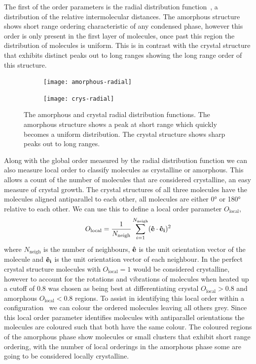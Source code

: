 The first of the order parameters is the radial distribution function~, a distribution of the relative intermolecular distances. The amorphous structure shows short range ordering characteristic of any condensed phase, however this order is only present in the first layer of molecules, once past this region the distribution of molecules is uniform. This is in contrast with the crystal structure that exhibits distinct peaks out to long ranges showing the long range order of this structure.

\begin{figure}
    \begin{subfigure}{0.5\textwidth}
        \texttt{[image: amorphous-radial]}
        \caption{}
        \label{fig:amorphous radial}
    \end{subfigure}
    \begin{subfigure}{0.5\textwidth}
        \texttt{[image: crys-radial]}
        \caption{}
        \label{fig:crys radial}
    \end{subfigure}
    \caption{The amorphous  and crystal  radial distribution functions. The amorphous structure shows a peak at short range which quickly becomes a uniform distribution. The crystal structure shows sharp peaks out to long ranges.}
    \label{fig:frame comp}
\end{figure}

Along with the global order measured by the radial distribution function we can also measure local order to classify molecules as crystalline or amorphous. This allows a count of the number of molecules that are considered crystalline, an easy measure of crystal growth. The crystal structures of all three molecules have the molecules aligned antiparallel to each other, all molecules are either \ang{0} or \ang{180} relative to each other. We can use this to define a local order parameter $O_\text{local}$,
\begin{equation}
    O_{\text{local}} = \frac{1}{N_{\text{neigh}}}\sum_{i=1}^{N_\text{neigh}} (\mathbf{\hat e} \cdot \mathbf{\hat e_i})^2
\end{equation}
where $N_\text{neigh}$ is the number of neighbours, $\mathbf{\hat e}$ is the unit orientation vector of the molecule and $\mathbf{\hat e_i}$ is the unit orientation vector of each neighbour. In the perfect crystal structure molecules with $O_\text{local}=1$ would be considered crystalline, however to account for the rotations and vibrations of molecules when heated up a cutoff of \num{0.8} was chosen as being best at differentiating crystal $O_\text{local}> 0.8$ and amorphous $O_\text{local} < 0.8$ regions. To assist in identifying this local order within a configuration~ we can colour the ordered molecules leaving all others grey. Since this local order parameter identifies molecules with antiparallel orientations the molecules are coloured such that both have the same colour. The coloured regions of the amorphous phase show molecules or small clusters that exhibit short range ordering, with the number of local orderings in the amorphous phase some are going to be considered locally crystalline.

